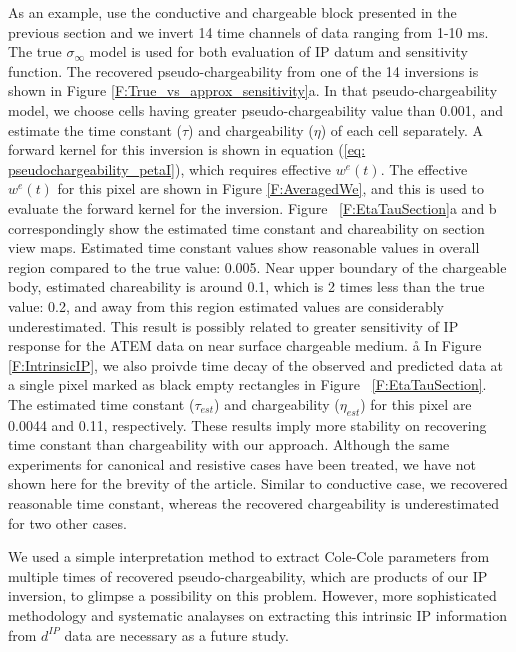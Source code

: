 \documentclass[extra,mreferee]{gji}
\newcommand{\siginf}{\sigma_\infty}
\newcommand{\dip}{d^{IP}}
\begin{document}
As an example, use the conductive and chargeable block presented in the previous section and we invert 14 time channels of data ranging from 1-10 ms.  The true $\siginf$ model is used  for both evaluation of IP datum and sensitivity function. The recovered pseudo-chargeability from one of the 14 inversions is shown in Figure \ref{F:True_vs_approx_sensitivity}a. In that pseudo-chargeability model, we choose cells having greater pseudo-chargeability value than 0.001, and estimate the time constant ($\tau$) and chargeability ($\eta$) of each cell separately. 
A forward kernel for this inversion is shown in equation (\ref{eq: pseudochargeability_petaI}), which requires effective $w^e(t)$. 
The effective $w^e(t)$ for this pixel are shown in Figure \ref{F:AveragedWe}, and this is used to evaluate the forward kernel for the inversion.
Figure ~\ref{F:EtaTauSection}a and b correspondingly show the estimated time constant and chareability on section view maps.
Estimated time constant values show reasonable values in overall region compared to the true value: 0.005. 
Near upper boundary of the chargeable body, estimated chareability is around 0.1, which is 2 times less than the true value: 0.2, and away from this region estimated values are considerably underestimated. 
This result is possibly related to greater sensitivity of IP response for the ATEM data on near surface chargeable medium. å
In Figure \ref{F:IntrinsicIP}, we also proivde time decay of the observed and predicted data at a single pixel marked as black empty rectangles in Figure ~\ref{F:EtaTauSection}.
The estimated time constant ($\tau_{est}$) and chargeability ($\eta_{est}$) for this pixel are 0.0044 and 0.11, respectively. 
These results imply more stability on recovering time constant than chargeability with our approach. Although the same experiments for canonical and resistive cases have been treated, we have not shown here for the brevity of the article.
Similar to conductive case, we recovered reasonable time constant, whereas the recovered chargeability is underestimated for two other cases. 

We used a simple interpretation method to extract Cole-Cole parameters from multiple times of recovered pseudo-chargeability, which are products of our IP inversion, to glimpse a possibility on this problem. 
However, more sophisticated methodology and systematic analayses on extracting this intrinsic IP information from $\dip$ data are necessary as a future study. 
\end{document}
